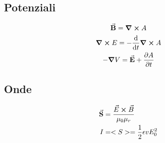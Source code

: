 \documentclass[a4paper]{article}
\begin{document}
\subsection{Potenziali}
\begin{gather}
    \va B = \curl{A} \\
    \curl{E} = -\dv{t}\curl{A}\\
    -\grad{V} = \va E + \pdv{A}{t}
\end{gather}

\subsection{Onde}

\begin{align}
    \va S & = \frac{\vec E \cross \vec B}{\mu_0 \mu_r}\\
    I & = <S> = \frac{1}{2}\epsilon v E^2_0
\end{align}

\pagebreak
\end{document}
